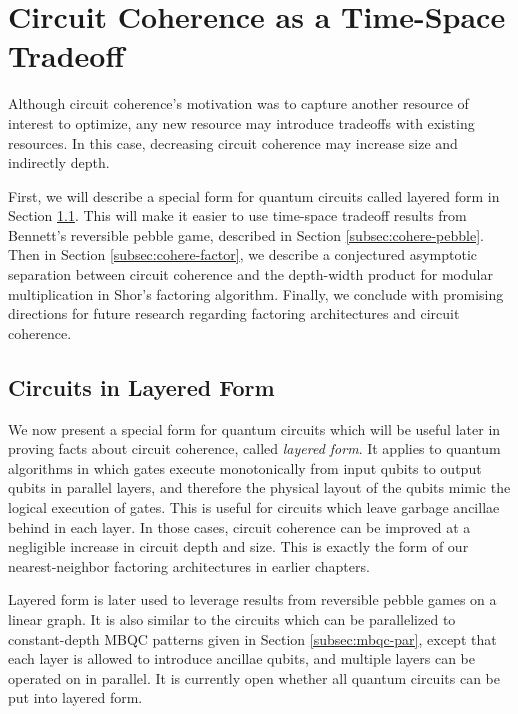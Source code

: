 \section{Circuit Coherence as a Time-Space Tradeoff}
\label{sec:cohere-tradeoff}

Although circuit coherence's motivation was to capture another resource
of interest to optimize, any new resource may introduce tradeoffs with
existing resources. In this case, decreasing circuit coherence
may increase size and indirectly depth.

First, we will describe a special form for quantum circuits called
layered form in Section \ref{subsec:cohere-lqc}. This will make
it easier to use time-space tradeoff results from Bennett's
reversible pebble game, described in Section \ref{subsec:cohere-pebble}.
Then in Section \ref{subsec:cohere-factor}, we describe a conjectured asymptotic separation
between circuit coherence and the depth-width product for modular
multiplication in Shor's factoring algorithm. Finally, we conclude with
promising directions for future research regarding factoring architectures
and circuit coherence.

\subsection{Circuits in Layered Form}
\label{subsec:cohere-lqc}

We now present a special form for quantum circuits which will be useful
later in proving facts about circuit coherence, called \emph{layered form}.
It applies to quantum algorithms in which gates execute
monotonically from input qubits to output qubits in parallel layers,
and therefore the physical layout of the qubits mimic the logical
execution of gates. This is useful for circuits which leave
garbage ancillae behind in each layer. In those cases,
circuit coherence can be improved at a negligible increase
in circuit depth and size. This is exactly the form of our
nearest-neighbor factoring architectures in earlier chapters.

Layered form is later used to leverage
results from reversible pebble games on a linear graph. It is also
similar to the circuits which can be parallelized to
constant-depth
MBQC patterns given in Section \ref{subsec:mbqc-par}, except that
each layer is allowed to introduce ancillae qubits, and multiple layers
can be operated on in parallel.
It is currently open whether
all quantum circuits can be put into layered form.

